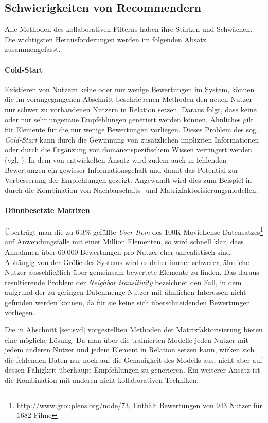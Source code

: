 \subsection{Schwierigkeiten von Recommendern}\label{sec:filterissues}

Alle Methoden des kollaborativen Filterns haben ihre Stärken und Schwächen. Die wichtigsten Herausforderungen werden im folgenden Absatz zusammengefasst.
\paragraph{Cold-Start} Existieren von Nutzern keine oder nur wenige Bewertungen im System, können die im vorangegangenen Abschnitt beschriebenen Methoden den neuen Nutzer nur schwer zu vorhandenen Nutzern in Relation setzen. Daraus folgt, dass keine oder nur sehr ungenaue Empfehlungen generiert werden können. Ähnliches gilt für Elemente für die nur wenige Bewertungen vorliegen. Dieses Problem des sog. \textit{Cold-Start} kann durch die Gewinnung von zusätzlichen impliziten Informationen oder durch die Ergänzung von domänenspezifischem Wissen verringert werden (vgl. \citep{claypool99}).  In dem von \citep{Steck:2010:TTR:1835804.1835895} entwickelten Ansatz wird zudem auch in fehlenden Bewertungen ein gewisser Informationsgehalt und damit das Potential zur Verbesserung der Empfehlungen gezeigt. Angewandt wird dies zum Beispiel in \citep{Toscher:2008:INA:1722149.1722153} durch die Kombination von Nachbarschafts- und Matrixfaktorisierungsmodellen.

\paragraph{Dünnbesetzte Matrizen} Überträgt man die zu 6.3\% gefüllte \textit{User-Item} des 100K MovieLense Datensatzes\footnote{http://www.grouplens.org/node/73, Enthält Bewertungen von 943 Nutzer für 1682 Filme} auf Anwendungsfälle mit einer Million Elementen, so wird schnell klar, dass Annahmen über 60.000 Bewertungen pro Nutzer eher unrealistisch sind. Abhängig von der Größe des Systems wird es daher immer schwerer, ähnliche Nutzer ausschließlich über gemeinsam bewertete Elemente zu finden. Das daraus resultierende Problem der \textit{Neighbor transitivity} bezeichnet den Fall, in dem aufgrund der zu geringen Datenmenge Nutzer mit ähnlichen Interessen nicht gefunden werden können, da für sie keine sich überschneidenden Bewertungen vorliegen.

Die in Abschnitt \ref{sec:svd} vorgestellten Methoden der Matrixfaktorisierung bieten eine mögliche Lösung. Da man über die trainierten Modelle jeden Nutzer mit jedem anderen Nutzer und jedem Element in Relation setzen kann, wirken sich die fehlenden Daten nur noch auf die Genauigkeit des Modells aus, nicht aber auf dessen Fähigkeit überhaupt Empfehlungen zu generieren. Ein weiterer Ansatz ist die Kombination mit anderen nicht-kollaborativen Techniken. \citep{Koren:2009:MFT:1608565.1608614,claypool99}


